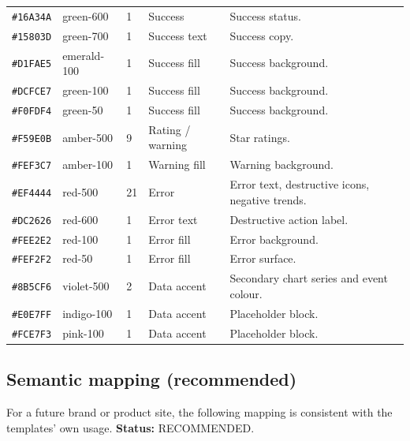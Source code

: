 \begin{longtable}{p{2.3cm}p{2.2cm}p{1.7cm}p{1.2cm}p{5.8cm}}
\texttt{\#16A34A} & green-600 & 1 & Success & Success status. \\
\texttt{\#15803D} & green-700 & 1 & Success text & Success copy. \\
\texttt{\#D1FAE5} & emerald-100 & 1 & Success fill & Success background. \\
\texttt{\#DCFCE7} & green-100 & 1 & Success fill & Success background. \\
\texttt{\#F0FDF4} & green-50 & 1 & Success fill & Success background. \\
\texttt{\#F59E0B} & amber-500 & 9 & Rating / warning & Star ratings. \\
\texttt{\#FEF3C7} & amber-100 & 1 & Warning fill & Warning background. \\
\texttt{\#EF4444} & red-500 & 21 & Error & Error text, destructive icons, negative
trends. \\
\texttt{\#DC2626} & red-600 & 1 & Error text & Destructive action label. \\
\texttt{\#FEE2E2} & red-100 & 1 & Error fill & Error background. \\
\texttt{\#FEF2F2} & red-50 & 1 & Error fill & Error surface. \\
\texttt{\#8B5CF6} & violet-500 & 2 & Data accent & Secondary chart series and event
colour. \\
\texttt{\#E0E7FF} & indigo-100 & 1 & Data accent & Placeholder block. \\
\texttt{\#FCE7F3} & pink-100 & 1 & Data accent & Placeholder block. \\
\bottomrule
\end{longtable}

\subsection*{Semantic mapping (recommended)}

For a future brand or product site, the following mapping is consistent with the
templates' own usage. \textbf{Status:} RECOMMENDED.

